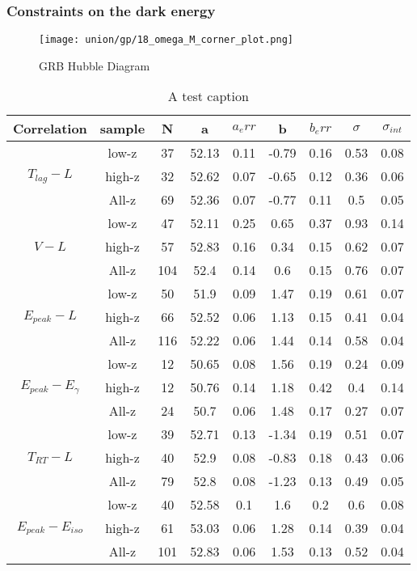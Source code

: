 \subsubsection{Constraints on the dark energy}
\begin{figure}[h]
	\centering
	\texttt{[image: union/gp/18\_omega\_M\_corner\_plot.png]}
	\caption{GRB Hubble Diagram}
	\label{fig:OmegaM_GP_union}
\end{figure}
\begin{table}
\centering
\begin{tabular}{|c|c|c|c|c|c|c|c|c|}
\hline
Correlation & sample & N & a & $a_err$ & b & $b_err$ & $\sigma$ & $\sigma_{int}$\\
\hline
\multirow{3}{*}{$T_{lag}-L$} & low-z & 37 & 52.13 & 0.11 & -0.79 & 0.16 & 0.53 & 0.08\\
\cline{2-9}
 & high-z & 32 & 52.62 & 0.07 & -0.65 & 0.12 & 0.36 & 0.06\\
\cline{2-9}
 & All-z & 69 & 52.36 & 0.07 & -0.77 & 0.11 & 0.5 & 0.05\\
\hline
\multirow{3}{*}{$V-L$} & low-z & 47 & 52.11 & 0.25 & 0.65 & 0.37 & 0.93 & 0.14\\
\cline{2-9}
 & high-z & 57 & 52.83 & 0.16 & 0.34 & 0.15 & 0.62 & 0.07\\
\cline{2-9}
 & All-z & 104 & 52.4 & 0.14 & 0.6 & 0.15 & 0.76 & 0.07\\
\hline
\multirow{3}{*}{$E_{peak}-L$} & low-z & 50 & 51.9 & 0.09 & 1.47 & 0.19 & 0.61 & 0.07\\
\cline{2-9}
 & high-z & 66 & 52.52 & 0.06 & 1.13 & 0.15 & 0.41 & 0.04\\
\cline{2-9}
 & All-z & 116 & 52.22 & 0.06 & 1.44 & 0.14 & 0.58 & 0.04\\
\hline
\multirow{3}{*}{$E_{peak}-E_{\gamma}$} & low-z & 12 & 50.65 & 0.08 & 1.56 & 0.19 & 0.24 & 0.09\\
\cline{2-9}
 & high-z & 12 & 50.76 & 0.14 & 1.18 & 0.42 & 0.4 & 0.14\\
\cline{2-9}
 & All-z & 24 & 50.7 & 0.06 & 1.48 & 0.17 & 0.27 & 0.07\\
\hline
\multirow{3}{*}{$T_{RT}-L$} & low-z & 39 & 52.71 & 0.13 & -1.34 & 0.19 & 0.51 & 0.07\\
\cline{2-9}
 & high-z & 40 & 52.9 & 0.08 & -0.83 & 0.18 & 0.43 & 0.06\\
\cline{2-9}
 & All-z & 79 & 52.8 & 0.08 & -1.23 & 0.13 & 0.49 & 0.05\\
\hline
\multirow{3}{*}{$E_{peak}-E_{iso}$} & low-z & 40 & 52.58 & 0.1 & 1.6 & 0.2 & 0.6 & 0.08\\
\cline{2-9}
 & high-z & 61 & 53.03 & 0.06 & 1.28 & 0.14 & 0.39 & 0.04\\
\cline{2-9}
 & All-z & 101 & 52.83 & 0.06 & 1.53 & 0.13 & 0.52 & 0.04\\
\hline
\end{tabular}
\caption{A test caption}
\label{table_gp_union}
\end{table}